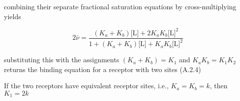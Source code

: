 combining their separate fractional saturation equations by cross-multiplying yields

\begin{equation}
	2  \bar{\nu} = \frac{(K_a + K_b)\text{[L]} + 2 K_a K_b \text{[L]}^2}{1 + (K_a + K_b)\text{[L]} + K_a K_b \text{[L]}^2}
\end{equation}

substituting this with the assignments \((K_a + K_b) = K_1\) and \(K_a K_b = K_1 K_2\) returns the binding equation for a receptor with two sites (A.2.4)

If the two receptors have equivalent receptor sites, i.e., \(K_a = K_b = k\), then \(K_1 = 2k\)




\clearpage
